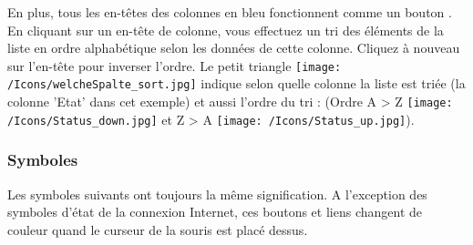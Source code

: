 En plus, tous les en-têtes des colonnes en bleu fonctionnent comme un bouton . En cliquant sur un en-tête de colonne, vous effectuez un tri des éléments de la liste en ordre alphabétique selon les données de cette colonne. Cliquez à nouveau sur l'en-tête pour inverser l'ordre. 
Le petit triangle \texttt{[image: /Icons/welcheSpalte\_sort.jpg]}  indique selon quelle colonne la liste est triée (la colonne 'Etat' dans cet exemple) et aussi l'ordre du tri : (Ordre A {\textgreater} Z \texttt{[image: /Icons/Status\_down.jpg]} et Z {\textgreater} A \texttt{[image: /Icons/Status\_up.jpg]}).

\pagebreak
\subsubsection{Symboles}
\label{bkm:Ref443039356}
Les symboles suivants ont toujours la même signification. A l'exception des symboles d'état de la connexion Internet, ces boutons et liens changent de couleur quand le curseur de la souris est placé dessus.

